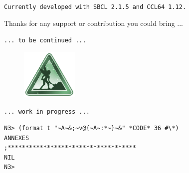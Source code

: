 \documentclass{article}
\begin{document}
\bigskip

\texttt{\small Currently developed with SBCL 2.1.5 and CCL64 1.12.}

\bigskip

Thanks for any support or contribution you could bring ...

\bigskip 
\bigskip

\centerline{\texttt{{\footnotesize ... to be continued ...}}}
\begin{figure}[htbp]
\begin{center}
\includegraphics[width=2.7cm]{2223}
\end{center}
\end{figure}
\vspace{-5mm}
\centerline{\texttt{{\footnotesize ... work in progress ...}}}

\bigskip
\bigskip

\begin{lstlisting}[language=sectitle]
N3> (format t "~A~&;~v@{~A~:*~}~&" *CODE* 36 #\*)
ANNEXES
;************************************
NIL
N3> 
\end{lstlisting}

\end{document}
